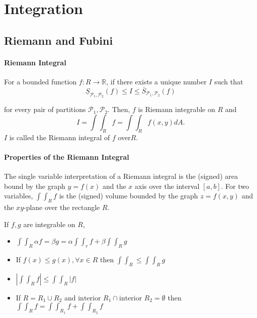 \newcommand\barbelow[1]{\stackunder[1.2pt]{$#1$}{\rule{.8ex}{.075ex}}}

\section{Integration}

\subsection{Riemann and Fubini}

\paragraph{Riemann Integral}

For a bounded function \(f: R \to \mathbb{R}\), if there exists a unique
number \(I\) such that
\[
    \underline{S}_{\mathcal{P}_1, \mathcal{P}_2}(f) \leq I \leq \bar{S}_{\mathcal{P}_1, \mathcal{P}_2}(f)
\]

for every pair of partitions \(\mathcal{P}_1, \mathcal{P}_2\). Then, \(f\) is Riemann
integrable on \(R\) and
\[I = \int\int_R f = \int\int_R f(x, y) dA.\]
\(I\) is called the Riemann integral of \(f\) over\(R\).

\paragraph{Properties of the Riemann Integral}
The single variable interpretation of a Riemann integral is the (signed) area bound by the 
graph \(y = f(x)\) and the \(x\) axis over the interval \([a, b]\).
For two variables, \(\int\int_R f\) is the (signed) volume bounded by the graph
\(z = f(x, y)\) and the \(xy\)-plane over the rectangle \(R\).

If \(f, g\) are integrable on \(R\),
\begin{itemize}
    \item \(\int\int_R \alpha f = \beta g = \alpha \int\int_r f + \beta \int\int_R g\)
    \item If \(f(x)\leq g(x), \forall x\in R\) then \(\int\int_R \leq \int\int_R g\)
    \item \(\left| \int\int_R f \right| \leq \int\int_R \left| f \right | \)
    \item If \(R = R_1 \cup R_2\) and \(\text{interior }R_1 \cap \text{interior }R_2 = \emptyset\) then
    \(\int\int_R f = \int\int_{R_1} f + \int\int_{R_2} f\)
\end{itemize}

